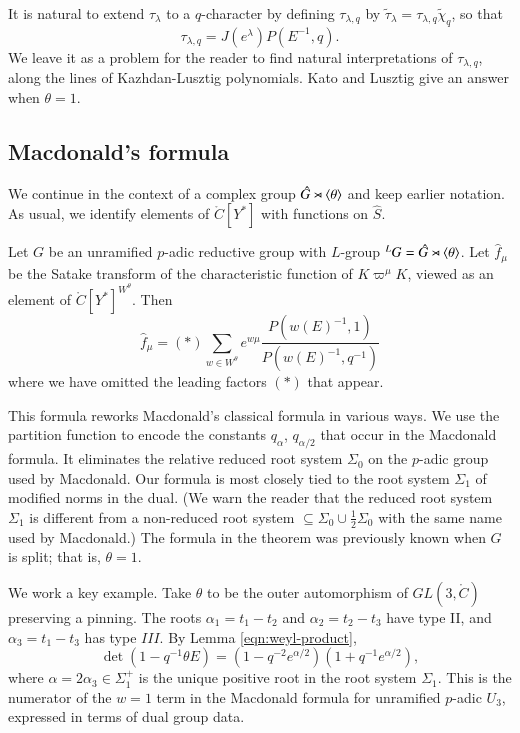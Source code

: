 It is natural to extend $\tau_\lambda$ to a $q$-character by defining $\tau_{\lambda,q}$ by
$\tilde \tau_\lambda = \tau_{\lambda,q} \tilde \chi_q$, so that
\[
\tau_{\lambda,q} = J(e^\lambda) P(E^{-1},q).
\]
We leave it as a problem for the reader to find natural interpretations of $\tau_{\lambda,q}$, along the lines of Kazhdan-Lusztig
polynomials.  Kato and Lusztig give an answer when $\theta=1$.


\subsection{Macdonald's formula}\label{sec:macdonald}


We continue in the context of a complex group $\hat G \rtimes \langle{\theta}\rangle$ and keep earlier notation.
As usual, we identify elements of $\ring{C}[Y^*]$ with functions on $\hat S$.  

\begin{theorem}
Let $G$ be an unramified $p$-adic reductive group with $L$-group ${}^LG = \hat G \rtimes \langle{\theta}\rangle$.
Let $\hat f_\mu$ be the Satake transform of the characteristic function of $K\varpi^\mu K$, viewed as an element
of $\ring{C}[Y^*]^{W^\theta}$.  Then
\[
\hat f_\mu = (*) \sum_{w\in W^\theta} e^{w\mu} \frac{P(w(E)^{-1},1)}{P(w(E)^{-1},q^{-1})}
\]
where we have omitted the leading factors $(*)$ that appear.
\end{theorem}

This formula reworks Macdonald's classical formula in various ways.
We use the partition function to
encode the constants $q_\alpha$, $q_{\alpha/2}$ that occur in the Macdonald formula.  It eliminates
the relative reduced root system $\Sigma_0$ on the $p$-adic group used by Macdonald.  Our formula is most closely
tied to the root system $\Sigma_1$ of modified norms in the dual. (We warn the reader that the reduced root system $\Sigma_1$
is different from a non-reduced root system $\subseteq \Sigma_0 \cup \frac{1}{2}\Sigma_0$ 
with the same name used by Macdonald.)
The formula in the theorem was previously known when $G$ is split; that is, $\theta=1$.

We work a key example.  
Take $\theta$ to be the outer automorphism of $GL(3,\ring{C})$ preserving a pinning.  
The roots $\alpha_1 = t_1-t_2$ and $\alpha_2 = t_2-t_3$ have type II,
and $\alpha_3=t_1-t_3$ has type $III$.  By Lemma \ref{eqn:weyl-product},
\[
\det(1- q^{-1} \theta E) = (1- q^{-2} e^{\alpha/2}) (1 + q^{-1} e^{\alpha/2}),
\]
where $\alpha=2\alpha_3\in \Sigma_1^+$ is the unique positive root in the root system $\Sigma_1$.
This is  the numerator of the $w=1$ term 
in the Macdonald formula for unramified $p$-adic $U_3$, expressed in terms of dual group data.



